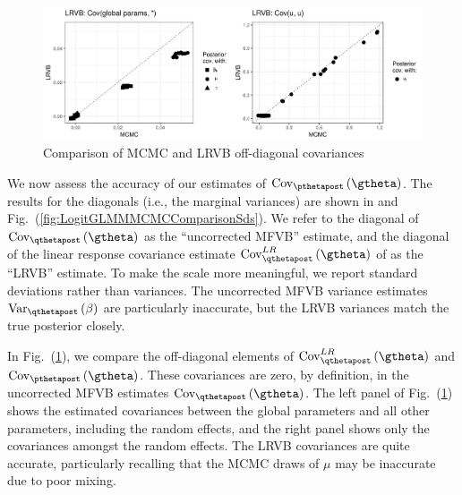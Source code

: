 \documentclass{article}\usepackage[]{graphicx}\usepackage[]{color}
\newenvironment{knitrout}{}{} %
\theoremstyle{plain}
\theoremstyle{definition}
\theoremstyle{plain}
\theoremstyle{plain}
\theoremstyle{plain}
\theoremstyle{plain}
\newcommand{\fig}[1]{Fig.~(\ref{fig:#1})}
\begin{document}
\begin{knitrout}
\color{fgcolor}\begin{figure}[!h]

{\centering \includegraphics[width=0.98\linewidth,height=0.343\linewidth]{figure/LogitGLMMMCMCComparisonCovariances-1} 

}

\caption[Comparison of MCMC and LRVB off-diagonal covariances]{Comparison of MCMC and LRVB off-diagonal covariances}\label{fig:LogitGLMMMCMCComparisonCovariances}
\end{figure}


\end{knitrout}
We now assess the accuracy of our estimates of $\cov_{\pthetapost}\left(\gtheta\right)$.
The results for the diagonals (i.e., the marginal variances) are shown
in  and \fig{LogitGLMMMCMCComparisonSds}.
We refer to the diagonal of $\cov_{\qthetapost}\left(\gtheta\right)$
as the ``uncorrected MFVB'' estimate, and the diagonal of the linear
response covariance estimate $\lrvbcov\left(\gtheta\right)$ of 
as the ``LRVB'' estimate. To make the scale more meaningful, we
report standard deviations rather than variances. The uncorrected
MFVB variance estimates $\var_{\qthetapost}\left(\beta\right)$ are
particularly inaccurate, but the LRVB variances match the true posterior
closely.

In \fig{LogitGLMMMCMCComparisonCovariances}, we compare the off-diagonal
elements of $\lrvbcov\left(\gtheta\right)$ and $\cov_{\pthetapost}\left(\gtheta\right)$.
These covariances are zero, by definition, in the uncorrected MFVB
estimates $\cov_{\qthetapost}\left(\gtheta\right)$. The left panel
of \fig{LogitGLMMMCMCComparisonCovariances} shows the estimated covariances
between the global parameters and all other parameters, including
the random effects, and the right panel shows only the covariances
amongst the random effects. The LRVB covariances are quite accurate,
particularly recalling that the MCMC draws of $\mu$ may be inaccurate
due to poor mixing.
\end{document}
